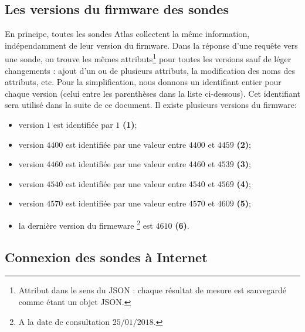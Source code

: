 \subsection{Les versions du firmware des sondes} \label{subsec:firmwareversion}
En principe, toutes les sondes Atlas collectent la même information, indépendamment de leur version du firmware. Dans la  réponse  d'une requête vers une sonde, on trouve les mêmes attributs\footnote{Attribut dans le sens du JSON : chaque résultat de mesure est sauvegardé comme étant un objet JSON.}  pour toutes les versions sauf de léger changements : ajout d'un ou de plusieurs attributs, la modification des noms des attributs, etc. Pour la simplification, nous donnons un identifiant entier pour chaque version (celui entre les parenthèses dans la liste ci-dessous). Cet identifiant sera utilisé dans la suite de ce document. 
Il existe plusieurs versions du firmware:
\begin{itemize}
	\item version $1$ est identifiée par  $1$\textbf{ (1)};
	\item version $4400$  est identifiée par une valeur entre  $4400$ et $4459$ \textbf{(2)};
	\item version $4460$ est identifiée par une valeur entre $4460$ et $4539$ \textbf{(3)};
	\item version $4540$  est identifiée par une valeur entre  $4540$ et $4569$ \textbf{(4)};
	\item  version $4570$  est identifiée par une valeur entre $4570$ et $4609$ \textbf{(5)};
	\item la dernière version du firmeware \footnote{A la date de consultation $ 25/01/2018 $.} est $4610$ \textbf{(6)}. 
\end{itemize}

\subsection{Connexion des sondes à Internet}

